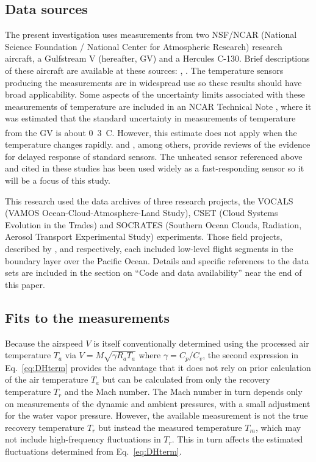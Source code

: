 \documentclass[amt, manuscript]{copernicus}
\begin{document}
\subsection{Data sources}

The present investigation uses measurements from two NSF/NCAR (National
Science Foundation / National Center for Atmospheric Research) research
aircraft, a Gulfstream V (hereafter, GV) and a Hercules C-130. Brief
descriptions of these aircraft are available at these sources:
\citet{GV}, \citet{C130}. The temperature sensors producing the
measurements are in widespread use so these results should have broad
applicability. Some aspects of the uncertainty limits associated with
these measurements of temperature are included in an NCAR Technical Note
\citep{cooper2016ncartn}, where it was estimated that the standard
uncertainty in measurements of temperature from the GV is about
\unit{0.3^{\circ}C}. However, this estimate does not apply when the
temperature changes rapidly. \citet{FrieheKhelif1992} and
\citet{LawsonRodi1992}, among others, provide reviews of the evidence
for delayed response of standard sensors. The unheated sensor referenced
above and cited in these studies has been used widely as a
fast-responding sensor so it will be a focus of this study.

This research used the data archives of three research projects, the
VOCALS (VAMOS Ocean-Cloud-Atmosphere-Land Study), CSET (Cloud Systems
Evolution in the Trades) and SOCRATES (Southern Ocean Clouds, Radiation,
Aerosol Transport Experimental Study) experiments. Those field projects,
described by \citet{wood2011vamos}, \citet{albrecht2019CSET} and
\citet{mcfarquhar2021observations} respectively, each included low-level
flight segments in the boundary layer over the Pacific Ocean. Details
and specific references to the data sets are included in the section on
``Code and data availability'' near the end of this paper.

\subsection{Fits to the measurements}

Because the airspeed \(V\) is itself conventionally determined using the
processed air temperature \(T_{a}\) via \(V=M\sqrt{\gamma R_{a}T_{a}}\)
where \(\gamma=C_{p}/C_{v}\), the second expression in
Eq.~\eqref{eq:DHterm} provides the advantage that it does not rely on
prior calculation of the air temperature \(T_{a}\) but can be calculated
from only the recovery temperature \(T_{r}\) and the Mach number. The
Mach number in turn depends only on measurements of the dynamic and
ambient pressures, with a small adjustment for the water vapor pressure.
However, the available measurement is not the true recovery temperature
\(T_{r}\) but instead the measured temperature \(T_{m}\), which may not
include high-frequency fluctuations in \(T_{r}\). This in turn affects
the estimated fluctuations determined from Eq.~\eqref{eq:DHterm}.
\end{document}
